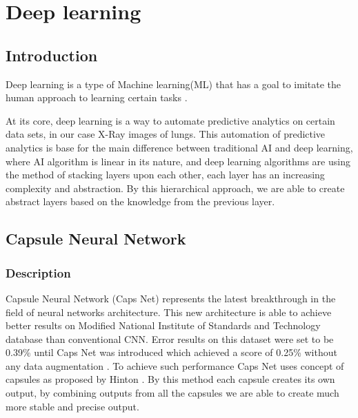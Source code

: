 \chapter{Deep learning} 
\section{Introduction}
    Deep learning is a type of Machine learning(ML) that has a goal to imitate the human approach to learning
    certain tasks \cite{Deep learning}. 

    At its core, deep learning is a way to automate predictive analytics on certain data sets, in our case X-Ray images of lungs.
    This automation of predictive analytics is base for the main difference between traditional AI and deep learning, where AI algorithm 
    is linear in its nature, and deep learning algorithms are using the method of stacking layers upon each other, each layer has an increasing 
    complexity and abstraction. By this hierarchical approach, we are able to create abstract layers based on the knowledge from the previous layer.

\section{Capsule Neural Network}
    \subsection{Description}
        Capsule Neural Network (Caps Net) represents the latest breakthrough in the field of neural networks architecture. 
        This new architecture is able to achieve better results on Modified National Institute of Standards and Technology database than conventional CNN. 
        Error results on this dataset were set to be 0.39\% 
        until Caps Net was introduced which achieved a score of 0.25\% without any data augmentation \cite{Capsule Neural Network performance on complex data}. 
        To achieve such performance Caps Net uses  concept of capsules as proposed by Hinton \cite{Dynamic routing between capsules}. By this method each
        capsule creates its own output, by combining outputs from all the capsules we are able to create much more stable and precise output.

